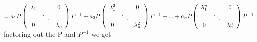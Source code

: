 \documentclass[letterpaper,12pt]{article}
\theoremstyle{definition}
\begin{document}
 $= a_1P 
 \left(
    \begin{array}{ccccc}
\lambda_1 &     & 0  \\
          &\ddots             &   \\
    0      &      & \lambda_n
  \end{array}\right)
P^{-1}
  + a_2P
  \left(
    \begin{array}{ccccc}
\lambda_1^2 &     & 0 \\
          &\ddots             &   \\
    0     &      & \lambda_n^2
  \end{array}\right)
P^{-1} +
  ...+a_nP
  \left(
    \begin{array}{ccccc}
\lambda_1^n &     & 0  \\
          &\ddots             &   \\
    0     &      & \lambda_n^n
  \end{array}\right)
P^{-1}\\
$
\\
factoring out the P and $P^{-1}$ we get\\
\\
\end{document}
